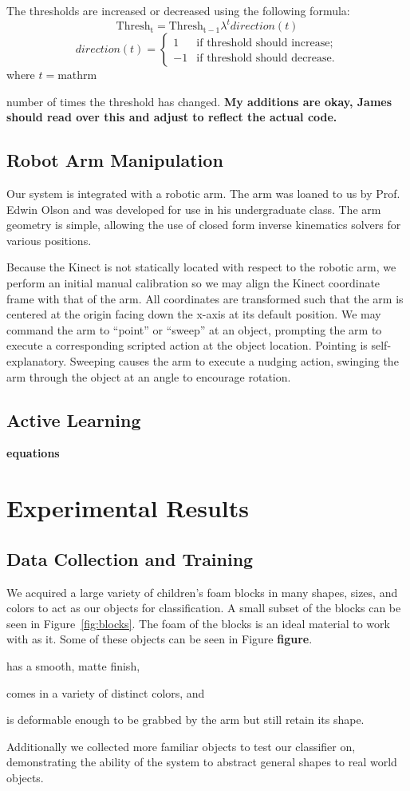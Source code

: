 \documentclass[11pt]{article}
\newcommand{\xxx}[1]{{\bf \color{red} #1}}
\newcommand{\meh}[1]{{\bf \color{blue} #1}}
\begin{document}
The thresholds are increased or decreased using the following formula:
$$\mathrm{Thresh_{t}} = \mathrm{Thresh_{t-1}}  \lambda^tdirection(t)$$
\[direction(t) = \left\{ \begin{array}{ll}
         1 & \mbox{if threshold should increase};\\
         -1 & \mbox{if threshold should decrease}.\end{array} \right. \]
where $t=$mathrm{number of times the threshold has changed.
\meh{My additions are okay, James should read over this and adjust to reflect
the actual code.}

\subsection{Robot Arm Manipulation}
Our system is integrated with a robotic arm. The arm was loaned to us by Prof.
Edwin Olson and was developed for use in his undergraduate class. The arm
geometry is simple, allowing the use of closed form inverse kinematics solvers
for various positions.

Because the Kinect is not statically located with respect to the robotic arm,
we perform an initial manual calibration so we may align the Kinect coordinate
frame with that of the arm. All coordinates are transformed such that the arm
is centered at the origin facing down the x-axis at its default position. We
may command the arm to ``point'' or ``sweep'' at an object, prompting the arm
to execute a corresponding scripted action at the object location. Pointing is
self-explanatory. Sweeping causes the arm to execute a nudging action,
swinging the arm through the object at an angle to encourage rotation.

\subsection{Active Learning}

\xxx{equations}
\section{Experimental Results}

\subsection{Data Collection and Training}
We acquired a large variety of children's foam blocks in many shapes, sizes,
and colors to act as our objects for classification. A small subset of the
blocks can be seen in Figure~\ref{fig:blocks}. The foam of the blocks is an
ideal material to work with as it. Some of these
objects can be seen in Figure \meh{figure}.
\begin{inparaenum}[(1)]
\item has a smooth, matte finish,
\item comes in a variety of distinct colors, and
\item is deformable enough to be grabbed by the arm but still retain its
shape.
\end{inparaenum}
Additionally we collected
more familiar objects to test our classifier on, demonstrating the ability of
the system to abstract general shapes to real world objects.


}
\end{document}
